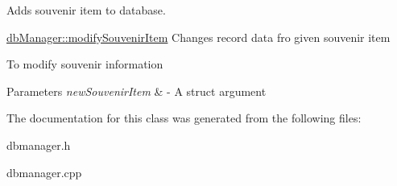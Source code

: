 Adds souvenir item to database. 

\mbox{\hyperlink{classdb_manager_a4d1f437fbf2bed7786324a8dcf639a4a}{db\+Manager\+::modify\+Souvenir\+Item}} Changes record data fro given souvenir item

To modify souvenir information 
\begin{DoxyParams}{Parameters}
{\em new\+Souvenir\+Item} & -\/ A struct argument \\
\hline
\end{DoxyParams}


The documentation for this class was generated from the following files\+:\begin{DoxyCompactItemize}
\item 
dbmanager.\+h\item 
dbmanager.\+cpp\end{DoxyCompactItemize}
